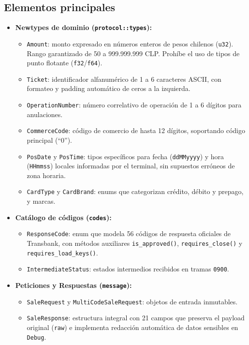 \documentclass{../../plantilla/raysac-informe}
\begin{document}
\subsection{Elementos principales}
\begin{itemize}
  \item \textbf{Newtypes de dominio (\texttt{protocol::types}):}
    \begin{itemize}
      \item \texttt{Amount}: monto expresado en números enteros de pesos chilenos (\texttt{u32}). Rango
        garantizado de 50 a 999.999.999 CLP. Prohíbe el uso de tipos de punto flotante (\texttt{f32}/\texttt{f64}).
      \item \texttt{Ticket}: identificador alfanumérico de 1 a 6 caracteres ASCII, con formateo y padding
        automático de ceros a la izquierda.
      \item \texttt{OperationNumber}: número correlativo de operación de 1 a 6 dígitos para anulaciones.
      \item \texttt{CommerceCode}: código de comercio de hasta 12 dígitos, soportando código principal (``0'').
      \item \texttt{PosDate} y \texttt{PosTime}: tipos específicos para fecha (\texttt{ddMMyyyy}) y hora
        (\texttt{HHmmss}) locales informadas por el terminal, sin supuestos erróneos de zona horaria.
      \item \texttt{CardType} y \texttt{CardBrand}: enums que categorizan crédito, débito y prepago, y marcas.
    \end{itemize}
  \item \textbf{Catálogo de códigos (\texttt{codes}):}
    \begin{itemize}
      \item \texttt{ResponseCode}: enum que modela 56 códigos de respuesta oficiales de Transbank, con métodos
        auxiliares \texttt{is\_approved()}, \texttt{requires\_close()} y \texttt{requires\_load\_keys()}.
      \item \texttt{IntermediateStatus}: estados intermedios recibidos en tramas \texttt{0900}.
    \end{itemize}
  \item \textbf{Peticiones y Respuestas (\texttt{message}):}
    \begin{itemize}
      \item \texttt{SaleRequest} y \texttt{MultiCodeSaleRequest}: objetos de entrada inmutables.
      \item \texttt{SaleResponse}: estructura integral con 21 campos que preserva el payload original
        (\texttt{raw}) e implementa redacción automática de datos sensibles en \texttt{Debug}.
    \end{itemize}
\end{itemize}
\end{document}
